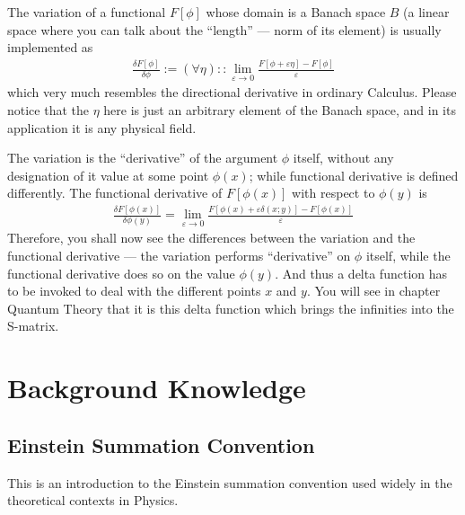 \documentclass[letterpaper,10pt,english]{sphinxmanual}
\begin{document}
The variation of a functional \(F[\phi]\) whose domain is a Banach space \(B\) (a linear space where you can talk about the ``length'' --- norm of its element) is usually implemented as 
\begin{equation*}
\begin{split}\frac{\delta F[\phi]}{\delta\phi} := (\forall \eta) :: \lim_{\varepsilon\rightarrow 0}\frac{F[\phi+\varepsilon\eta]-F[\phi]}{\varepsilon}\end{split}
\end{equation*}
which very much resembles the directional derivative in ordinary Calculus. Please notice that the \(\eta\) here is just an arbitrary element of the Banach space, and in its application it is any physical field.

The variation is the ``derivative'' of the argument \(\phi\) itself, without any designation of it value at some point \(\phi(x)\); while functional derivative is defined differently. The functional derivative of \(F[\phi(x)]\) with respect to  \(\phi(y)\) is
\begin{equation*}
\begin{split}\frac{\delta F[\phi(x)]}{\delta\phi(y)} = \lim_{\varepsilon\rightarrow 0}\frac{F[\phi(x)+\varepsilon\delta(x;y)]-F[\phi(x)]}{\varepsilon}\end{split}
\end{equation*}
Therefore, you shall now see the differences between the variation and the functional derivative --- the variation performs ``derivative'' on \(\phi\) itself, while the functional derivative does so on the value \(\phi(y)\). And thus a delta function has to be invoked to deal with the different points \(x\) and \(y\). You will see in chapter Quantum Theory that it is this delta function which brings the infinities into the S-matrix.


\chapter{Background Knowledge}
\label{\detokenize{background::doc}}\label{\detokenize{background:background-knowledge}}

\section{Einstein Summation Convention}
\label{\detokenize{bg_eins:einstein-summation-convention}}\label{\detokenize{bg_eins::doc}}
This is an introduction to the Einstein summation convention used widely in the theoretical contexts in Physics.
\end{document}
